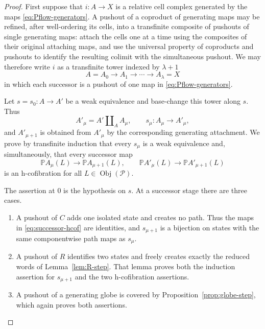 \documentclass[12pt,a4paper]{amsart}
\newcommand{\Pcat}{\mathcal P}
\newcommand{\Path}{\mathbb P}
\newcommand{\Obj}{\operatorname{Obj}}
\theoremstyle{definition}
\begin{document}
\begin{proof}
First suppose that \(i: A\to X\) is a relative cell complex generated by the maps \eqref{eq:Pflow-generators}.  A pushout of a coproduct of generating maps may be refined, after well-ordering its cells, into a transfinite composite of pushouts of single generating maps: attach the cells one at a time using the composites of their original attaching maps, and use the universal property of coproducts and pushouts to identify the resulting colimit with the simultaneous pushout.  We may therefore write \(i\) as a transfinite tower indexed by \(\lambda+1\)
\[
 A=A_0\longrightarrow A_1\longrightarrow\cdots
 \longrightarrow A_\lambda=X
\]
in which each successor is a pushout of one map in \eqref{eq:Pflow-generators}.

Let \(s=s_0: A\to A'\) be a weak equivalence and base-change this tower along \(s\).  Thus
\[
 A'_\mu=A'\amalg_{A}A_\mu,
 \qquad s_\mu: A_\mu\longrightarrow A'_\mu,
\]
and \(A'_{\mu+1}\) is obtained from \(A'_\mu\) by the corresponding generating attachment.  We prove by transfinite induction that every \(s_\mu\) is a weak equivalence and, simultaneously, that every successor map
\begin{equation}\label{eq:successor-hcof}
 \Path A_\mu(L)\longrightarrow\Path A_{\mu+1}(L),
 \qquad
 \Path A'_\mu(L)\longrightarrow\Path A'_{\mu+1}(L)
\end{equation}
is an h-cofibration for all \(L\in\Obj(\Pcat)\).

The assertion at \(0\) is the hypothesis on \(s\).  At a successor stage there are three cases.
\begin{enumerate}
\item A pushout of \(C\) adds one isolated state and creates no path.  Thus
the maps in \eqref{eq:successor-hcof} are identities, and \(s_{\mu+1}\) is a
bijection on states with the same componentwise path maps as \(s_\mu\).
\item A pushout of \(R\) identifies two states and freely creates exactly the
reduced words of Lemma~\ref{lem:R-step}.  That lemma proves both the
induction assertion for \(s_{\mu+1}\) and the two h-cofibration assertions.
\item A pushout of a generating globe is covered by
Proposition~\ref{prop:globe-step}, which again proves both assertions.
\end{enumerate}


\end{proof}
\end{document}
